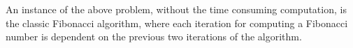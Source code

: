 An instance of the above problem, without the time consuming
computation, is the classic Fibonacci algorithm, where each
iteration for computing a Fibonacci number is dependent
on the previous two iterations of the algorithm.



\begin{comment}
Consider the following general pattern of serial code:
%
\begin{lstlisting}
  data x = init();
  for(int i = 0; i < n; i++) {
    x = f(x);
    process(x);
  }
\end{lstlisting}
%
The above code describes the typical case where a loop
computes a value \lstinline|x| based on the value
\lstinline|x| computed in the previous iteration.
It further calls a general method \lstinline|process(data x)|
to process the computed value.

The serial Fibonacci algorithm is an instance of the above
pattern.
%
\begin{lstlisting}
  int x = 0;
  int y = 1;
  for(int i = 0; i < n; i++) {
    int z = x;
    y += x;
    x = z;
  }
\end{lstlisting}
%
By observing the above serial Fibonacci algorithm and
the concurrent Fibonacci algorithm and by assuming
that \lstinline|process(data x)| is not dependent on shared resources,
we can generalise a two node concurrent implementation of the
former general programming pattern as:
%
\begin{lstlisting}[caption={Code for Node A}]
  data x = init();
  for(int i = 0; i < n; i++) {
    b.send(Choice.NEXT);
    b.send(x);
    process(x);
    x = a.recv();
    if(i++ < n)
      x = f(x);
  }
    b.send(Choice.END);
\end{lstlisting}
%
and
%
%
\begin{lstlisting}[caption={Code for Node B}]
  data x = init();
  loop: do {
    switch(a.recv()) {
      case Choice.NEXT:
        x = a.recv();
        x = foo(x);
        a.send(x);
        process(x);
        continue loop;
      case Choice.END:
        break loop;
    }
  } while(true);
\end{lstlisting}

The global type of the above protocol is the same as
the protocol for the concurrent Fibonacci algorithm,
up-to the type of the carried data.

The generalisation gives evidence that session types
can be used to describe the parallelisation structure
of patterns of serial code. This structure is expressed
by means of communication interaction.

Someone might argue that, because of the serial dependency
nature of the serial algorithm there is a reduced speed-up
in the parallelised code, due to the fact that we are using
more resources. However, if method \lstinline|process(data x)|
is resource demanding enough we can manage to obtain the analogous
speed-up.
\end{comment}


